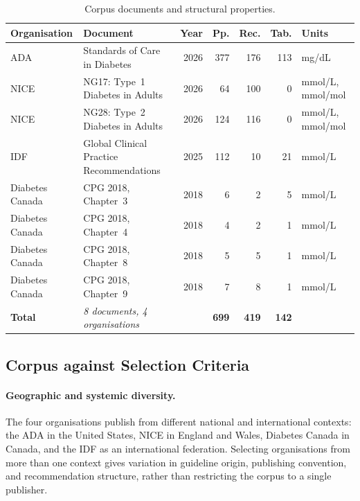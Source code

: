\begin{table}[!ht]
\centering
\small\setlength{\tabcolsep}{5pt}
\begin{tabular}{p{2.1cm} p{5.2cm} r r r r p{2.0cm}}
\hline
\textbf{Organisation} & \textbf{Document} & \textbf{Year} & \textbf{Pp.}
                      & \textbf{Rec.} & \textbf{Tab.} & \textbf{Units} \\
\hline
ADA
  & Standards of Care in Diabetes
  & 2026 & 377 & 176 & 113 & mg/dL \\[2pt]
NICE
  & NG17: Type~1 Diabetes in Adults
  & 2026 &  64 & 100 &   0 & mmol/L, \newline mmol/mol \\[2pt]
NICE
  & NG28: Type~2 Diabetes in Adults
  & 2026 & 124 & 116 &   0 & mmol/L, \newline mmol/mol \\[2pt]
IDF
  & Global Clinical Practice Recommendations
  & 2025 & 112 &   10 &  21 & mmol/L \\[2pt]
Diabetes Canada
  & CPG 2018, Chapter~3
  & 2018 &   6 &  2 &  5 & mmol/L \\[2pt]
Diabetes Canada
  & CPG 2018, Chapter~4
  & 2018 &   4 &  2 &   1 & mmol/L \\[2pt]
Diabetes Canada
  & CPG 2018, Chapter~8
  & 2018 &   5 &  5 &  1 & mmol/L \\[2pt]
Diabetes Canada
  & CPG 2018, Chapter~9
  & 2018 &   7 &  8 &   1 & mmol/L \\[2pt]
\hline
\textbf{Total}
  & \textit{8 documents, 4 organisations}
  & & \textbf{699} & \textbf{419} & \textbf{142} & \\
\hline
\end{tabular}
\caption{Corpus documents and structural properties.}
\label{tab:corpus}
\end{table}

\subsection{Corpus against Selection Criteria}
\label{sec:corpus-criteria}

\paragraph{Geographic and systemic diversity.}
The four organisations publish from different national and international
contexts: the ADA in the United States, NICE in England and Wales, Diabetes
Canada in Canada, and the IDF as an international federation. Selecting
organisations from more than one context gives variation in guideline origin,
publishing convention, and recommendation structure, rather than restricting
the corpus to a single publisher.

